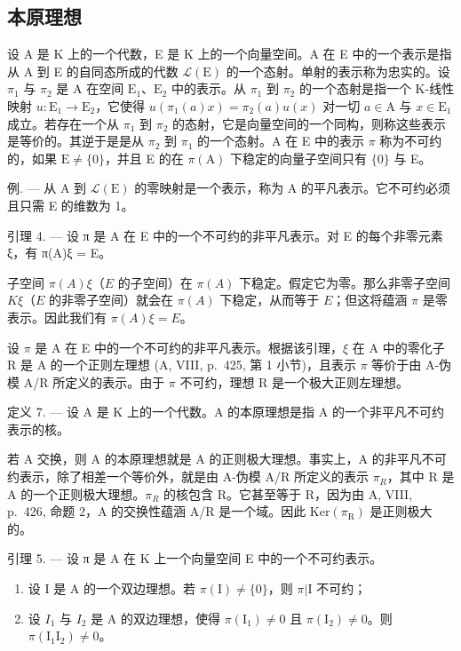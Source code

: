 \subsection{本原理想}

设 A 是 K 上的一个代数，E 是 K 上的一个向量空间。A 在 E 中的一个表示是指从 A 到 E 的自同态所成的代数 \(\mathcal{L}(\mathrm{E})\) 的一个态射。单射的表示称为忠实的。设 \(\pi_1\) 与 \(\pi_2\) 是 A 在空间 \(\mathrm{E}_1\)、\(\mathrm{E}_2\) 中的表示。从 \(\pi_1\) 到 \(\pi_2\) 的一个态射是指一个 K-线性映射 \(u: \mathrm{E}_1 \to \mathrm{E}_2\)，它使得 \(u(\pi_1(a)x) = \pi_2(a)u(x)\) 对一切 \(a \in \mathrm{A}\) 与 \(x \in \mathrm{E}_1\) 成立。若存在一个从 \(\pi_1\) 到 \(\pi_2\) 的态射，它是向量空间的一个同构，则称这些表示是等价的。其逆于是是从 \(\pi_2\) 到 \(\pi_1\) 的一个态射。A 在 E 中的表示 \(\pi\) 称为不可约的，如果 \(\mathrm{E} \neq \{0\}\)，并且 E 的在 \(\pi(\mathrm{A})\) 下稳定的向量子空间只有 \(\{0\}\) 与 E。

例. --- 从 A 到 \(\mathcal{L}(\mathrm{E})\) 的零映射是一个表示，称为 A 的平凡表示。它不可约必须且只需 E 的维数为 1。

引理 4. --- 设 π 是 A 在 E 中的一个不可约的非平凡表示。对 E 的每个非零元素 ξ，有 π(A)ξ = E。

子空间 \(\pi(A)\xi\)（\(E\) 的子空间）在 \(\pi(A)\) 下稳定。假定它为零。那么非零子空间 \(K\xi\)（\(E\) 的非零子空间）就会在 \(\pi(A)\) 下稳定，从而等于 \(E\)；但这将蕴涵 \(\pi\) 是零表示。因此我们有 \(\pi(A)\xi = E\)。

设 \(\pi\) 是 A 在 E 中的一个不可约的非平凡表示。根据该引理，\(\xi\) 在 A 中的零化子 R 是 A 的一个正则左理想 (A, VIII, p.~425, 第 1 小节)，且表示 \(\pi\) 等价于由 A-伪模 A/R 所定义的表示。由于 \(\pi\) 不可约，理想 R 是一个极大正则左理想。

定义 7. --- 设 A 是 K 上的一个代数。A 的本原理想是指 A 的一个非平凡不可约表示的核。

若 A 交换，则 A 的本原理想就是 A 的正则极大理想。事实上，A 的非平凡不可约表示，除了相差一个等价外，就是由 A-伪模 A/R 所定义的表示 \(\pi_{R}\)，其中 R 是 A 的一个正则极大理想。\(\pi_{R}\) 的核包含 R。它甚至等于 R，因为由 A, VIII, p.~426, 命题 2，A 的交换性蕴涵 A/R 是一个域。因此 \(\text{Ker}(\pi_{\text{R}})\) 是正则极大的。

引理 5. --- 设 π 是 A 在 K 上一个向量空间 E 中的一个不可约表示。

\begin{enumerate}
\def\labelenumi{\alph{enumi})}
\item
  设 I 是 A 的一个双边理想。若 \(\pi(\mathrm{I}) \neq \{0\}\)，则 \(\pi|\mathrm{I}\) 不可约；
\item
  设 \(I_{1}\) 与 \(I_{2}\) 是 A 的双边理想，使得 \(\pi(\mathrm{I}_{1}) \neq 0\) 且 \(\pi(\mathrm{I}_{2}) \neq 0\)。则 \(\pi(\mathrm{I}_{1}\mathrm{I}_{2}) \neq 0\)。
\end{enumerate}

